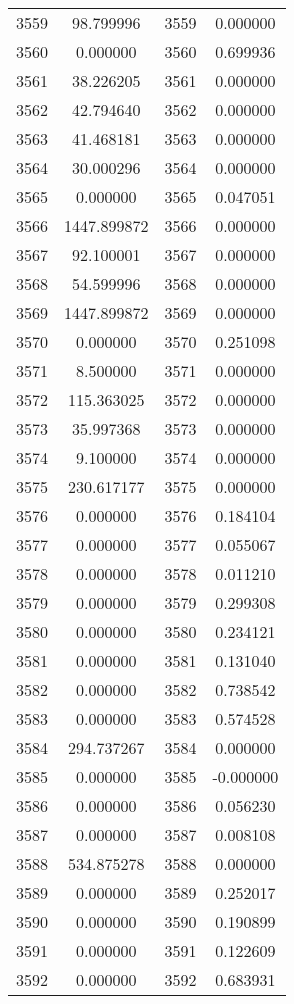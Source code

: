 \documentclass[12pt]{article}
\begin{document}
\begin{longtable}{@{}cccc@{}}
3559 & 98.799996 & 3559 & 0.000000 \\
3560 & 0.000000 & 3560 & 0.699936 \\
3561 & 38.226205 & 3561 & 0.000000 \\
3562 & 42.794640 & 3562 & 0.000000 \\
3563 & 41.468181 & 3563 & 0.000000 \\
3564 & 30.000296 & 3564 & 0.000000 \\
3565 & 0.000000 & 3565 & 0.047051 \\
3566 & 1447.899872 & 3566 & 0.000000 \\
3567 & 92.100001 & 3567 & 0.000000 \\
3568 & 54.599996 & 3568 & 0.000000 \\
3569 & 1447.899872 & 3569 & 0.000000 \\
3570 & 0.000000 & 3570 & 0.251098 \\
3571 & 8.500000 & 3571 & 0.000000 \\
3572 & 115.363025 & 3572 & 0.000000 \\
3573 & 35.997368 & 3573 & 0.000000 \\
3574 & 9.100000 & 3574 & 0.000000 \\
3575 & 230.617177 & 3575 & 0.000000 \\
3576 & 0.000000 & 3576 & 0.184104 \\
3577 & 0.000000 & 3577 & 0.055067 \\
3578 & 0.000000 & 3578 & 0.011210 \\
3579 & 0.000000 & 3579 & 0.299308 \\
3580 & 0.000000 & 3580 & 0.234121 \\
3581 & 0.000000 & 3581 & 0.131040 \\
3582 & 0.000000 & 3582 & 0.738542 \\
3583 & 0.000000 & 3583 & 0.574528 \\
3584 & 294.737267 & 3584 & 0.000000 \\
3585 & 0.000000 & 3585 & -0.000000 \\
3586 & 0.000000 & 3586 & 0.056230 \\
3587 & 0.000000 & 3587 & 0.008108 \\
3588 & 534.875278 & 3588 & 0.000000 \\
3589 & 0.000000 & 3589 & 0.252017 \\
3590 & 0.000000 & 3590 & 0.190899 \\
3591 & 0.000000 & 3591 & 0.122609 \\
3592 & 0.000000 & 3592 & 0.683931 \\

\end{longtable}
\end{document}
